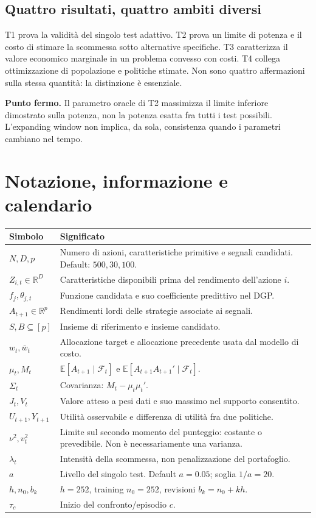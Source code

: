 \documentclass[11pt,a4paper]{article}
\theoremstyle{definition}\newtheorem{definition}[theorem]{Definizione}
\theoremstyle{remark}\newtheorem{remark}[theorem]{Osservazione}
\newcommand{\E}{\mathbb E}\newcommand{\PP}{\mathbb P}\newcommand{\R}{\mathbb R}
\newcommand{\F}{\mathcal F}\newcommand{\W}{\mathcal W}\newcommand{\supp}{\operatorname{supp}}
\newcommand{\important}[1]{\par\smallskip\noindent\colorbox{light}{\parbox{0.963\linewidth}{\textbf{Punto fermo.} #1}}\par\smallskip}
\begin{document}
\subsection{Quattro risultati, quattro ambiti diversi}
T1 prova la validità del singolo test adattivo. T2 prova un limite di potenza e il costo di stimare la scommessa sotto alternative specifiche. T3 caratterizza il valore economico marginale in un problema convesso con costi. T4 collega ottimizzazione di popolazione e politiche stimate. Non sono quattro affermazioni sulla stessa quantità: la distinzione è essenziale.

\important{Il parametro oracle di T2 massimizza il limite inferiore dimostrato sulla potenza, non la potenza esatta fra tutti i test possibili. L'expanding window non implica, da sola, consistenza quando i parametri cambiano nel tempo.}

\section{Notazione, informazione e calendario}
\label{sec:notation}
\begin{longtable}{p{.24\linewidth}p{.70\linewidth}}
\toprule Simbolo & Significato\\\midrule\endhead
$N,D,p$ & Numero di azioni, caratteristiche primitive e segnali candidati. Default: $500,30,100$.\\
$Z_{i,t}\in\R^D$ & Caratteristiche disponibili prima del rendimento dell'azione $i$.\\
$f_j,\theta_{j,t}$ & Funzione candidata e suo coefficiente predittivo nel DGP.\\
$A_{t+1}\in\R^p$ & Rendimenti lordi delle strategie associate ai segnali.\\
$S,B\subseteq[p]$ & Insieme di riferimento e insieme candidato.\\
$w_t,\bar w_t$ & Allocazione target e allocazione precedente usata dal modello di costo.\\
$\mu_t,M_t$ & $\E[A_{t+1}\mid\F_t]$ e $\E[A_{t+1}A_{t+1}'\mid\F_t]$.\\
$\Sigma_t$ & Covarianza: $M_t-\mu_t\mu_t'$.\\
$J_t,V_t$ & Valore atteso a pesi dati e suo massimo nel supporto consentito.\\
$U_{t+1},Y_{t+1}$ & Utilità osservabile e differenza di utilità fra due politiche.\\
$\nu^2,v_t^2$ & Limite sul secondo momento del punteggio: costante o prevedibile. Non è necessariamente una varianza.\\
$\lambda_t$ & Intensità della scommessa, non penalizzazione del portafoglio.\\
$a$ & Livello del singolo test. Default $a=0.05$; soglia $1/a=20$.\\
$h,n_0,b_k$ & $h=252$, training $n_0=252$, revisioni $b_k=n_0+kh$.\\
$\tau_c$ & Inizio del confronto/episodio $c$.\\
\bottomrule
\end{longtable}
\end{document}
